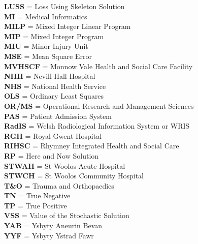 \documentclass[../thesis.tex]{subfiles}
\begin{document}
\textbf{LUSS} =  	 Loss Using Skeleton Solution\\
\textbf{MI} = Medical Informatics\\
\textbf{MILP} =  	 Mixed Integer Linear Program\\
\textbf{MIP} =  	 Mixed Integer Program\\
\textbf{MIU} =  	 Minor Injury Unit\\
\textbf{MSE} =  	 Mean Square Error\\
\textbf{MVHSCF} =  	 Monnow Vale Health and Social Care Facility\\
\textbf{NHH} =  	 Nevill Hall Hospital\\
\textbf{NHS} =  	 National Health Service\\
\textbf{OLS} =  	 Ordinary Least Squares\\
\textbf{OR/MS} = Operational Research and Management Sciences \\
\textbf{PAS} =  	 Patient Admission System\\
\textbf{RadIS} =  	 Welsh Radiological Information System or WRIS\\
\textbf{RGH} =  	 Royal Gwent Hospital\\
\textbf{RIHSC} =  	 Rhymney Integrated Health and Social Care\\
\textbf{RP} =  	 Here and Now Solution\\
\textbf{STWAH} =  	 St Woolos Acute Hospital\\
\textbf{STWCH} =  	 St Woolos Community Hospital\\
\textbf{T\&O } =	 Trauma and Orthopaedics  \\
\textbf{TN} = True Negative \\
\textbf{TP} = True Positive\\
\textbf{VSS} =  	 Value of the Stochastic Solution\\
\textbf{YAB} =  	 Ysbyty Aneurin Bevan\\
\textbf{YYF} =  	 Ysbyty Ystrad Fawr\\
\vfill
\end{document}

